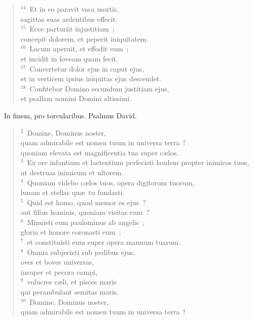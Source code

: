 \begin{flushleft}
\begin{verse}
${}^{14}$~Et in eo paravit vasa mortis,\\ sagittas suas ardentibus effecit.\\
${}^{15}$~Ecce parturiit injustitiam~;\\ concepit dolorem, et peperit iniquitatem.\\
${}^{16}$~Lacum aperuit, et effodit eum~;\\ et incidit in foveam quam fecit.\\
${}^{17}$~Convertetur dolor ejus in caput ejus,\\ et in verticem ipsius iniquitas ejus descendet.\\
${}^{18}$~Confitebor Domino secundum justitiam ejus,\\ et psallam nomini Domini altissimi.\end{verse}\end{flushleft}


~\lettrine[lines=10,image=true,loversize=0.05,lraise=-0.03]{I}{}n finem, pro torcularibus. Psalmus David.
\begin{flushleft}\begin{verse}\vspace{6pt}${}^{2}$~Domine, Dominus noster,\\ quam admirabile est nomen tuum in universa terra~!\\ quoniam elevata est magnificentia tua super c\ae los.\\
${}^{3}$~Ex ore infantium et lactentium perfecisti laudem propter inimicos tuos,\\ ut destruas inimicum et ultorem.\\
${}^{4}$~Quoniam videbo c\ae los tuos, opera digitorum tuorum,\\ lunam et stellas qu\ae\ tu fundasti.\\
${}^{5}$~Quid est homo, quod memor es ejus~?\\ aut filius hominis, quoniam visitas eum~?\\
${}^{6}$~Minuisti eum paulominus ab angelis~;\\ gloria et honore coronasti eum~;\\
${}^{7}$~et constituisti eum super opera manuum tuarum.\\
${}^{8}$~Omnia subjecisti sub pedibus ejus,\\ oves et boves universas,\\ insuper et pecora campi,\\
${}^{9}$~volucres c\ae li, et pisces maris\\ qui perambulant semitas maris.\\
${}^{10}$~Domine, Dominus noster,\\ quam admirabile est nomen tuum in universa terra~!\end{verse}\end{flushleft}


